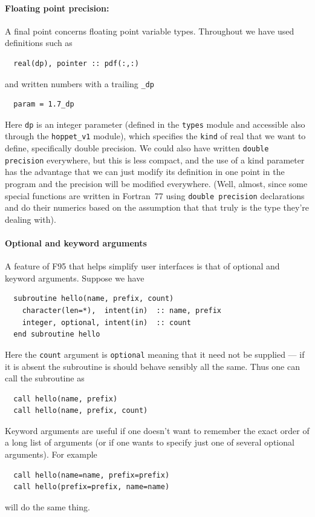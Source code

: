 \documentclass[12pt]{article}
\newcommand{\ttt}[1]{\texttt{#1}}
\begin{document}
\paragraph{Floating point precision:}
A final point concerns floating point variable types. Throughout we
have used definitions such as
\begin{lstlisting}
  real(dp), pointer :: pdf(:,:)
\end{lstlisting}
and written numbers with a trailing \texttt{\_dp}
\begin{lstlisting}
  param = 1.7_dp
\end{lstlisting}
Here \texttt{dp} is an integer parameter (defined in the
\texttt{types} module and accessible also through the
\texttt{hoppet\_v1} module), which specifies the \texttt{kind} of real
that we want to define, specifically double precision. We could also
have written \texttt{double precision} everywhere, but this is less
compact, and the use of a kind parameter has the advantage that we
can just modify its definition in one point in the program and the
precision will be modified everywhere. (Well, almost, since some
special functions are written in Fortran~77 using \texttt{double
  precision} declarations and do their numerics based on the
assumption that that truly is the type they're dealing with).


\paragraph{Optional and keyword arguments}

A feature of F95 that helps simplify user interfaces is that of
optional and keyword arguments. Suppose we have
\begin{lstlisting}
  subroutine hello(name, prefix, count)
    character(len=*),  intent(in)  :: name, prefix
    integer, optional, intent(in)  :: count
  end subroutine hello
\end{lstlisting}
Here the \ttt{count} argument is \ttt{optional} meaning that it need
not be supplied --- if it is absent the subroutine is should behave
sensibly all the same. Thus one can call the subroutine as
\begin{lstlisting}
  call hello(name, prefix)
  call hello(name, prefix, count)
\end{lstlisting}
Keyword arguments are useful if one doesn't want to remember the exact
order of a long list of arguments (or if one wants to specify just one
of several optional arguments). For example
\begin{lstlisting}
  call hello(name=name, prefix=prefix)
  call hello(prefix=prefix, name=name)
\end{lstlisting}
will do the same thing.
\end{document}

